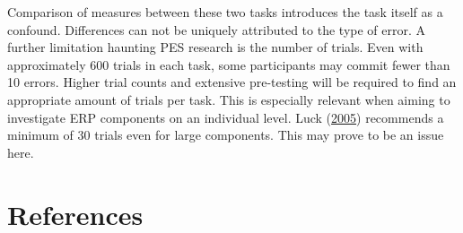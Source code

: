 \documentclass[
  man,floatsintext]{apa7}
\begin{document}
Comparison of measures between these two tasks introduces the task itself as a confound. Differences can not be uniquely attributed to the type of error. A further limitation haunting PES research is the number of trials. Even with approximately 600 trials in each task, some participants may commit fewer than 10 errors. Higher trial counts and extensive pre-testing will be required to find an appropriate amount of trials per task. This is especially relevant when aiming to investigate ERP components on an individual level. Luck (\protect\hyperlink{ref-luck2005ten}{2005}) recommends a minimum of 30 trials even for large components. This may prove to be an issue here.

\newpage

\hypertarget{references}{%
\section{References}\label{references}}
\end{document}
